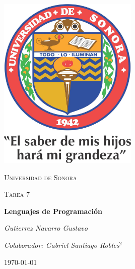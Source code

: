\documentclass{article}
\begin{document}
\begin{titlepage}
	\centering
	\includegraphics[width=0.5\textwidth]{unisonlogo.jpg}\par\vspace{1cm}
	{\scshape\LARGE Universidad de Sonora\par}
	\vspace{1cm}
	{\scshape\Large Tarea 7\par}
	\vspace{1.5cm}
	{\huge\bfseries Lenguajes de Programación\par}
	\vspace{2cm}
	{\Large\itshape Gutierrez Navarro Gustavo\par}
    {\small\itshape Colaborador: Gabriel Santiago Robles$^2$\par}
    
	\vfill
	\vfill
	{\large \today\par}
\end{titlepage}
\end{document}
